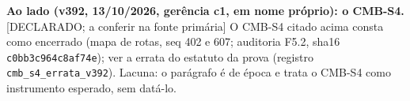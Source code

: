 \documentclass[11pt]{article}
\theoremstyle{definition}\newtheorem{deriv}{Derivação}
\begin{document}
\textbf{Ao lado (v392, 13/10/2026, gerência c1, em nome próprio): o CMB-S4.} \textsf{[DECLARADO; a conferir na fonte primária]} O CMB-S4 citado acima consta como encerrado (mapa de rotas, seq 402 e 607; auditoria F5.2, sha16 \texttt{c0bb3c964c8af74e}); ver a errata do estatuto da prova (registro \texttt{cmb\_s4\_errata\_v392}). Lacuna: o parágrafo é de época e trata o CMB-S4 como instrumento esperado, sem datá-lo.
\end{document}
